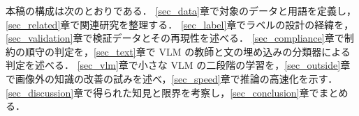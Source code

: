 本稿の構成は次のとおりである．
\ref{sec_data}章で対象のデータと用語を定義し，\ref{sec_related}章で関連研究を整理する．
\ref{sec_label}章でラベルの設計の経緯を，\ref{sec_validation}章で検証データとその再現性を述べる．
\ref{sec_compliance}章で制約の順守の判定を，\ref{sec_text}章で VLM の教師と文の埋め込みの分類器による判定を述べる．
\ref{sec_vlm}章で小さな VLM の二段階の学習を，\ref{sec_outside}章で画像外の知識の改善の試みを述べ，\ref{sec_speed}章で推論の高速化を示す．
\ref{sec_discussion}章で得られた知見と限界を考察し，\ref{sec_conclusion}章でまとめる．
